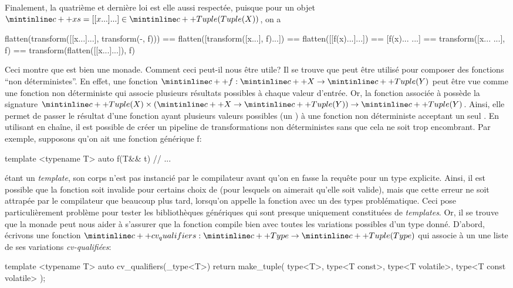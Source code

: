 Finalement, la quatrième et dernière loi est elle aussi respectée, puisque
pour un objet $\cc{xs = [[x...]...]} \in \cc{Tuple(Tuple(X))}$, on a
\begin{cpp}
    flatten(transform([[x...]...], transform(-, f)))
                        == flatten([transform([x...], f)...])
                        == flatten([[f(x)...]...])
                        == [f(x)... ...]
                        == transform([x... ...], f)
                        == transform(flatten([[x...]...]), f)
\end{cpp}

Ceci montre que  est bien une monade. Comment ceci peut-il nous
être utile? Il se trouve que  peut être utilisé pour composer des
fonctions ``non déterministes''. En effet, une fonction $\cc{f} : \cc{X} \to
\cc{Tuple(Y)}$ peut être vue comme une fonction non déterministe qui associe
plusieurs résultats possibles à chaque valeur d'entrée. Or, la fonction
 associée à  possède la signature $\cc{Tuple(X)} \times
(\cc{X} \to \cc{Tuple(Y)}) \to \cc{Tuple(Y)}$. Ainsi, elle permet de passer
le résultat d'une fonction ayant plusieurs valeurs possibles (un )
à une fonction non déterministe acceptant un seul . En utilisant
 en chaîne, il est possible de créer un pipeline de transformations
non déterministes sans que cela ne soit trop encombrant. Par exemple,
supposons qu'on ait une fonction générique f:
\begin{cpp}
    template <typename T>
    auto f(T&& t) {
        // ...
    }
\end{cpp}

 étant un \textit{template}, son corps n'est pas instancié par le
compilateur avant qu'on en fasse la requête pour un type  explicite.
Ainsi, il est possible que la fonction soit invalide pour certains choix de
 (pour lesquels on aimerait qu'elle soit valide), mais que cette erreur
ne soit attrapée par le compilateur que beaucoup plus tard, lorsqu'on appelle
la fonction avec un des types  problématique. Ceci pose particulièrement
problème pour tester les bibliothèques génériques qui sont presque uniquement
constituées de \textit{templates}. Or, il se trouve que la monade 
peut nous aider à s'assurer que la fonction  compile bien avec toutes
les variations possibles d'un type donné. D'abord, écrivons une fonction
$\cc{cv_qualifiers} : \cc{Type} \to \cc{Tuple(Type)}$ qui associe à un
 une liste de ses variations \textit{cv-qualifiées}:
\begin{cpp}
    template <typename T>
    auto cv_qualifiers(_type<T>) {
        return make_tuple(
            type<T>, type<T const>, type<T volatile>, type<T const volatile>
        );
    }
\end{cpp}

